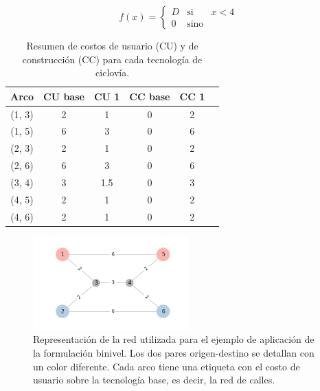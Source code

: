 \documentclass{article}
\begin{document}
  $$
    f(x) = \left\{ \begin{array}{lcr}
            D & \mbox{si}   & x < 4 \\
            0 & \mbox{sino} &
    \end{array}
    \right.
  $$

  \begin{table}[h!]
    \centering
    \begin{tabular}{cccccc}
      \toprule
      Arco & CU base & CU 1 & CC base & CC 1 & \\
      \midrule
        (1, 3) & 2 & 1   & 0 & 2 \\
        (1, 5) & 6 & 3   & 0 & 6 \\
        (2, 3) & 2 & 1   & 0 & 2 \\
        (2, 6) & 6 & 3   & 0 & 6 \\
        (3, 4) & 3 & 1.5 & 0 & 3 \\
        (4, 5) & 2 & 1   & 0 & 2 \\
        (4, 6) & 2 & 1   & 0 & 2 \\
      \bottomrule
    \end{tabular}
      \caption{Resumen de costos de usuario (CU) y de construcción (CC) para cada tecnología de ciclovía.}\label{table:example1arccosts}
  \end{table}

  \begin{figure}[h!]
    \centering
    \includegraphics[width=6cm]{../resources/example_1_base.png}
    \caption{Representación de la red utilizada para el ejemplo de aplicación de la formulación binivel. Los dos pares origen-destino se detallan con un color diferente. Cada arco tiene una etiqueta con el costo de usuario sobre la tecnología base, es decir, la red de calles.}
    \label{fig:example1base}
  \end{figure}
\end{document}
